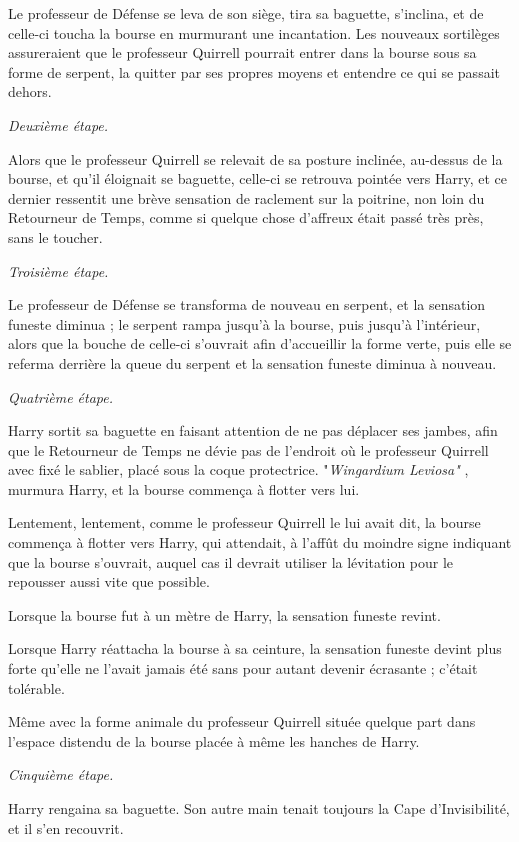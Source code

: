 Le professeur de Défense se leva de son siège, tira sa baguette, s'inclina, et de celle-ci toucha la bourse en murmurant une incantation. Les nouveaux sortilèges assureraient que le professeur Quirrell pourrait entrer dans la bourse sous sa forme de serpent, la quitter par ses propres moyens et entendre ce qui se passait dehors.

\emph{Deuxième étape.} 

Alors que le professeur Quirrell se relevait de sa posture inclinée, au-dessus de la bourse, et qu'il éloignait se baguette, celle-ci se retrouva pointée vers Harry, et ce dernier ressentit une brève sensation de raclement sur la poitrine, non loin du Retourneur de Temps, comme si quelque chose d'affreux était passé très près, sans le toucher.

\emph{Troisième étape.} 

Le professeur de Défense se transforma de nouveau en serpent, et la sensation funeste diminua ; le serpent rampa jusqu'à la bourse, puis jusqu'à l'intérieur, alors que la bouche de celle-ci s'ouvrait afin d'accueillir la forme verte, puis elle se referma derrière la queue du serpent et la sensation funeste diminua à nouveau.

\emph{Quatrième étape.} 

Harry sortit sa baguette en faisant attention de ne pas déplacer ses jambes, afin que le Retourneur de Temps ne dévie pas de l'endroit où le professeur Quirrell avec fixé le sablier, placé sous la coque protectrice. "\emph{Wingardium Leviosa"} , murmura Harry, et la bourse commença à flotter vers lui.

Lentement, lentement, comme le professeur Quirrell le lui avait dit, la bourse commença à flotter vers Harry, qui attendait, à l'affût du moindre signe indiquant que la bourse s'ouvrait, auquel cas il devrait utiliser la lévitation pour le repousser aussi vite que possible.

Lorsque la bourse fut à un mètre de Harry, la sensation funeste revint.

Lorsque Harry réattacha la bourse à sa ceinture, la sensation funeste devint plus forte qu'elle ne l'avait jamais été sans pour autant devenir écrasante ; c'était tolérable.

Même avec la forme animale du professeur Quirrell située quelque part dans l'espace distendu de la bourse placée à même les hanches de Harry.

\emph{Cinquième étape.} 

Harry rengaina sa baguette. Son autre main tenait toujours la Cape d'Invisibilité, et il s'en recouvrit.

